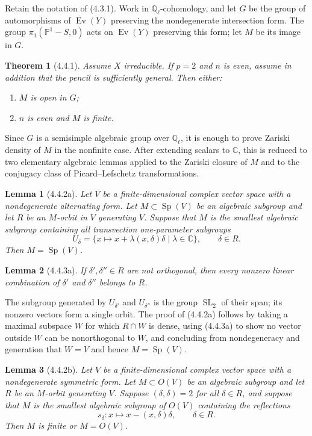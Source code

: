 \documentclass[11pt]{article}
\newtheorem{theorem}{Theorem}
\newtheorem{lemma}{Lemma}
\theoremstyle{remark}
\begin{document}
Retain the notation of (4.3.1). Work in $\mathbb Q_\ell$-cohomology, and let $G$ be the group of automorphisms of $\operatorname{Ev}(Y)$ preserving the nondegenerate intersection form. The group $\pi_1(\mathbb P^1-S,0)$ acts on $\operatorname{Ev}(Y)$ preserving this form; let $M$ be its image in $G$.

\begin{theorem}[4.4.1]
Assume $X$ irreducible. If $p=2$ and $n$ is even, assume in addition that the pencil is sufficiently general. Then either:
\begin{enumerate}[label=(\alph*)]
\item $M$ is open in $G$;
\item $n$ is even and $M$ is finite.
\end{enumerate}
\end{theorem}

Since $G$ is a semisimple algebraic group over $\mathbb Q_\ell$, it is enough to prove Zariski density of $M$ in the nonfinite case. After extending scalars to $\mathbb C$, this is reduced to two elementary algebraic lemmas applied to the Zariski closure of $M$ and to the conjugacy class of Picard--Lefschetz transformations.

\begin{lemma}[4.4.2a]
Let $V$ be a finite-dimensional complex vector space with a nondegenerate alternating form. Let $M\subset \operatorname{Sp}(V)$ be an algebraic subgroup and let $R$ be an $M$-orbit in $V$ generating $V$. Suppose that $M$ is the smallest algebraic subgroup containing all transvection one-parameter subgroups
\[
U_\delta=\{x\mapsto x+\lambda(x,\delta)\delta\mid \lambda\in\mathbb C\},\qquad \delta\in R.
\]
Then $M=\operatorname{Sp}(V)$.
\end{lemma}

\begin{lemma}[4.4.3a]
If $\delta',\delta''\in R$ are not orthogonal, then every nonzero linear combination of $\delta'$ and $\delta''$ belongs to $R$.
\end{lemma}

The subgroup generated by $U_{\delta'}$ and $U_{\delta''}$ is the group $\operatorname{SL}_2$ of their span; its nonzero vectors form a single orbit. The proof of (4.4.2a) follows by taking a maximal subspace $W$ for which $R\cap W$ is dense, using (4.4.3a) to show no vector outside $W$ can be nonorthogonal to $W$, and concluding from nondegeneracy and generation that $W=V$ and hence $M=\operatorname{Sp}(V)$.

\begin{lemma}[4.4.2b]
Let $V$ be a finite-dimensional complex vector space with a nondegenerate symmetric form. Let $M\subset O(V)$ be an algebraic subgroup and let $R$ be an $M$-orbit generating $V$. Suppose $(\delta,\delta)=2$ for all $\delta\in R$, and suppose that $M$ is the smallest algebraic subgroup of $O(V)$ containing the reflections
\[
s_\delta:x\mapsto x-(x,\delta)\delta,
\qquad \delta\in R.
\]
Then $M$ is finite or $M=O(V)$.
\end{lemma}
\end{document}
